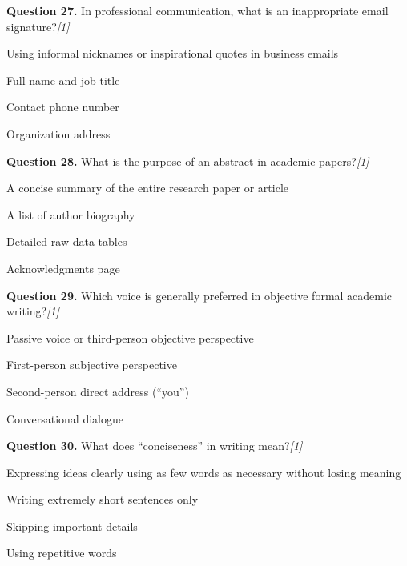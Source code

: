 \documentclass[11pt,a4paper]{article}
\newcommand{\pts}[1]{\hfill   \textit{[#1]}}
\begin{document}
\medskip




\noindent   \textbf{Question 27.} In professional communication, what is an inappropriate email signature?\pts{1}

\begin{parts}
  \item Using informal nicknames or inspirational quotes in business emails
  \item Full name and job title
  \item Contact phone number
  \item Organization address
\end{parts}

\medskip




\noindent   \textbf{Question 28.} What is the purpose of an abstract in academic papers?\pts{1}

\begin{parts}
  \item A concise summary of the entire research paper or article
  \item A list of author biography
  \item Detailed raw data tables
  \item Acknowledgments page
\end{parts}

\medskip




\noindent   \textbf{Question 29.} Which voice is generally preferred in objective formal academic writing?\pts{1}

\begin{parts}
  \item Passive voice or third-person objective perspective
  \item First-person subjective perspective
  \item Second-person direct address (``you'')
  \item Conversational dialogue
\end{parts}

\medskip




\noindent   \textbf{Question 30.} What does ``conciseness'' in writing mean?\pts{1}

\begin{parts}
  \item Expressing ideas clearly using as few words as necessary without losing meaning
  \item Writing extremely short sentences only
  \item Skipping important details
  \item Using repetitive words
\end{parts}
\end{document}
